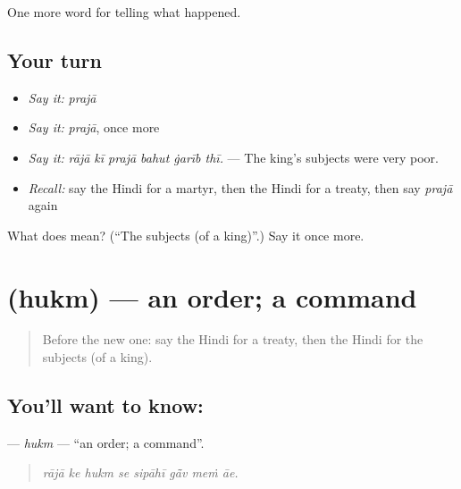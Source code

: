 \begin{grammarlens}[title={What you've built}]
One more word for telling what happened.
\end{grammarlens}

\subsection*{Your turn}
\begin{itemize}
\raggedright
  \item \emph{Say it:} \emph{prajā}
  \item \emph{Say it:} \emph{prajā}, once more
  \item \emph{Say it:} \emph{rājā kī prajā bahut ġarīb thī.} — The king's subjects were very poor.
  \item \emph{Recall:} say the Hindi for a martyr, then the Hindi for a treaty, then say \emph{prajā} again
\end{itemize}

\begin{tcolorbox}[breakable,colback=teal!4,colframe=teal!35!black,title={Before you move on}]
What does  mean? (\textquotedblleft{}The subjects (of a king)\textquotedblright{}.) Say it once more.
\end{tcolorbox}
\section[\texorpdfstring{\hi{हुक्म} (hukm)}{हुक्म (hukm)}]{ (hukm) — an order; a command}

\label{lesson:HI-C324-hukm}



\begin{quote}
Before the new one: say the Hindi for a treaty, then the Hindi for the subjects (of a king).
\end{quote}

\subsection*{You'll want to know: }
\textbf{} — \emph{hukm} — \textquotedblleft{}an order; a command\textquotedblright{}.

\begin{quote}
       
\end{quote}

\begin{quote}
\emph{rājā ke hukm se sipāhī gā̃v meṁ āe.}
\end{quote}

